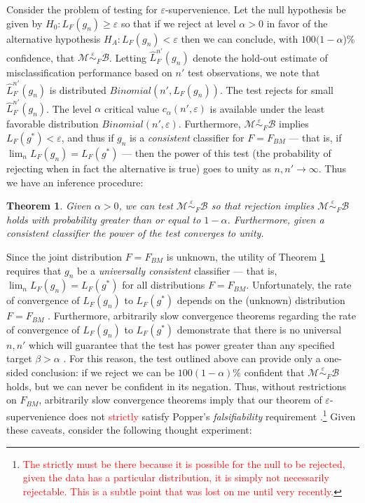 \documentclass{article}
\newcommand{\mB}{\mathcal{B}}
\newcommand{\mM}{\mathcal{M}}
\newcommand{\hL}{\widehat{L}}
\newcommand{\MeB}{\mM \overset{\varepsilon}{{\sim}}_F \mB}
\providecommand{\tr}[1]{\textcolor{red}{#1}}
\newtheorem{thm}{Theorem}
\begin{document}
Consider the problem of testing for $\varepsilon$-supervenience. Let the null hypothesis be given by $H_0: L_{F}(g_n) \geq \varepsilon$ so that if we reject at level $\alpha >0$ in favor of the alternative hypothesis $H_A: L_{F}(g_n) < \varepsilon$ then we can conclude, with $100(1-\alpha$)\% confidence, that $\MeB$. Letting $\hL^{n'}_{F}(g_n)$ denote the hold-out estimate of misclassification performance based on $n'$ test observations, we note that $\hL^{n'}_{F}(g_n)$ is distributed $Binomial(n',L_{F}(g_n))$. The test rejects for small $\hL^{n'}_{F}(g_n)$. The level $\alpha$ critical value $c_{\alpha}(n',\varepsilon)$ is available under the least favorable distribution $Binomial(n',\varepsilon)$. Furthermore, $\MeB$ implies $L_{F}(g^*) < \varepsilon$, and thus if $g_n$ is a {\it consistent} classifier for $F=F_{BM}$ --- that is, if $\lim_n L_{F}(g_n) = L_{F}(g^*)$ --- then the power of this test (the probability of rejecting when in fact the alternative is true) goes to unity as $n,n' \rightarrow \infty$. Thus we have an inference procedure: \begin{thm} \label{thm1} Given $\alpha > 0$, we can test $\MeB$ so that rejection implies $\MeB$ holds with probability greater than or equal to $1-\alpha$. Furthermore, given a consistent classifier the power of the test converges to unity. \end{thm}

Since the joint distribution $F=F_{BM}$ is unknown, the utility of Theorem \ref{thm1} requires that $g_n$ be a {\it universally consistent} classifier --- that is, $\lim_n L_{F}(g_n) = L_{F}(g^*)$ for all distributions $F=F_{BM}$. Unfortunately, the rate of convergence of $L_{F}(g_n)$ to $L_{F}(g^*)$ depends on the (unknown) distribution $F=F_{BM}$ \cite{DGL96}. Furthermore, arbitrarily slow convergence theorems regarding the rate of convergence of $L_{F}(g_n)$ to $L_{F}(g^*)$ demonstrate that there is no universal $n,n'$ which will guarantee that the test has power greater than any specified target $\beta > \alpha$ \cite{Devroye83}. For this reason, the test outlined above can provide only a one-sided conclusion: if we reject we can be $100(1-\alpha)$\% confident that $\MeB$ holds, but we can never be confident in its negation. Thus, without restrictions on $F_{BM}$, arbitrarily slow convergence theorems imply that our theorem of $\varepsilon$-supervenience does not \tr{strictly} satisfy Popper's {\it falsifiability} requirement \cite{Popper}.\footnote{\tr{The strictly must be there because it is possible for the null to be rejected, given the data has a particular distribution, it is simply not necessarily rejectable.  This is a subtle point that was lost on me until very recently.}} Given these caveats, consider the following thought experiment:
\end{document}
